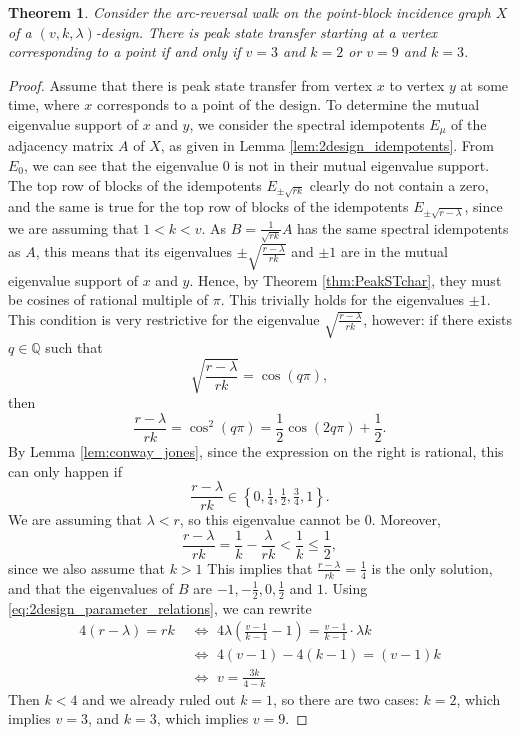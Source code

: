 \documentclass{article}
\newtheorem{theorem}{Theorem}[section]
\numberwithin{equation}{section}
\newcommand\rats{{\mathbb Q}}
\begin{document}
\begin{theorem}
\label{thm:block_designs_peakST}
Consider the arc-reversal walk on the point-block incidence graph $X$ of a $(v,k,\lambda)$-design. There is peak state transfer starting at a vertex corresponding to a point if and only if $v = 3$ and $k = 2$ or $v = 9$ and $k = 3$.
\end{theorem}
\begin{proof}
Assume that there is peak state transfer from vertex $x$ to vertex $y$ at some time, where $x$ corresponds to a point of the design. To determine the mutual eigenvalue support of $x$ and $y$, we consider the spectral idempotents $E_\mu$ of the adjacency matrix $A$ of $X$, as given in Lemma \ref{lem:2design_idempotents}. From $E_0$, we can see that the eigenvalue $0$ is not in their mutual eigenvalue support. The top row of blocks of the idempotents $E_{\pm \sqrt{rk}}$ clearly do not contain a zero, and the same is true for the top row of blocks of the idempotents $E_{\pm \sqrt{r - \lambda}}$, since we are assuming that $1 < k < v$. As $B = \frac{1}{\sqrt{rk}}A $ has the same spectral idempotents as $A$, this means that its eigenvalues $\pm \sqrt{\frac{r-\lambda}{rk}}$ and $\pm 1$ are in the mutual eigenvalue support of $x$ and $y$. Hence, by Theorem \ref{thm:PeakSTchar}, they must be cosines of rational multiple of $\pi$. This trivially holds for the eigenvalues $\pm 1$. This condition is very restrictive for the eigenvalue $\sqrt{\frac{r-\lambda}{rk}}$, however: if there exists $q \in \rats$ such that
\[
\sqrt{\frac{r-\lambda}{rk}} = \cos(q\pi),
\]
then 
\[
\frac{r-\lambda}{rk} = \cos^2(q\pi) = \frac{1}{2}\cos(2q \pi) + \frac{1}{2}.
\]
By Lemma \ref{lem:conway_jones}, since the expression on the right is rational, this can only happen if
\[
\frac{r-\lambda}{rk} \in \left\{0,\tfrac{1}{4}, \tfrac{1}{2}, \tfrac{3}{4}, 1\right\}.
\]
We are assuming that $\lambda < r$, so this eigenvalue cannot be 0. Moreover,
\[
\frac{r-\lambda}{rk} = \frac{1}{k} - \frac{\lambda}{rk} < \frac{1}{k} \leq \frac{1}{2},
\]
since we also assume that $k > 1$ This implies that $\frac{r - \lambda}{rk} = \frac{1}{4}$ is the only solution, and that the eigenvalues of $B$ are $-1,-\frac{1}{2},0,\frac{1}{2}$ and $1$. Using \eqref{eq:2design_parameter_relations}, we can rewrite
\[
\begin{split}
4(r-\lambda) = rk \,\, &\iff \,\, 4\lambda\left(\frac{v-1}{k-1}-1\right) = \frac{v-1}{k-1}\cdot \lambda k \\ 
&\iff \,\, 4(v-1) - 4(k-1) = (v-1)k \\
&\iff \,\, v = \frac{3k}{4-k}
\end{split}
\]
Then $k<4$ and we already ruled out $k=1$, so there are two cases: $k=2$, which implies $v=3$, and $k=3$, which implies $v=9$.


\end{proof}
\end{document}
